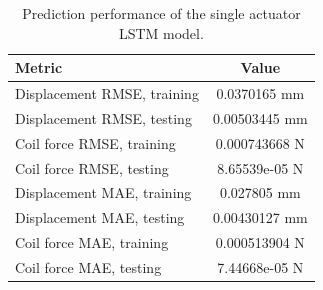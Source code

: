 \begin{table}[H]
\centering
\caption{Prediction performance of the single actuator LSTM model.}
\label{tab:lstm_prediction_metrics}
\begin{tabular}{l c}
\hline
Metric & Value \\ 
\hline
Displacement RMSE, training & 0.0370165 mm \\ 
Displacement RMSE, testing & 0.00503445 mm \\ 
Coil force RMSE, training & 0.000743668 N \\ 
Coil force RMSE, testing & 8.65539e-05 N \\ 
Displacement MAE, training & 0.027805 mm \\ 
Displacement MAE, testing & 0.00430127 mm \\ 
Coil force MAE, training & 0.000513904 N \\ 
Coil force MAE, testing & 7.44668e-05 N \\ 
\hline
\end{tabular}
\end{table}
